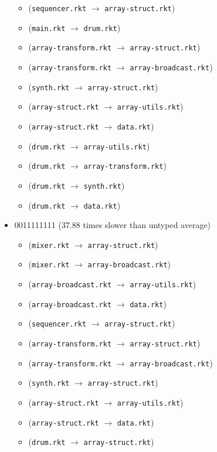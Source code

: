 \documentclass{article}
\newcommand{\mono}[1]{\texttt{#1}}
\begin{document}
\begin{itemize}
\begin{itemize}
  \item (\mono{sequencer.rkt} $\rightarrow$ \mono{array-struct.rkt})
  \item (\mono{main.rkt} $\rightarrow$ \mono{drum.rkt})
  \item (\mono{array-transform.rkt} $\rightarrow$ \mono{array-struct.rkt})
  \item (\mono{array-transform.rkt} $\rightarrow$ \mono{array-broadcast.rkt})
  \item (\mono{synth.rkt} $\rightarrow$ \mono{array-struct.rkt})
  \item (\mono{array-struct.rkt} $\rightarrow$ \mono{array-utils.rkt})
  \item (\mono{array-struct.rkt} $\rightarrow$ \mono{data.rkt})
  \item (\mono{drum.rkt} $\rightarrow$ \mono{array-utils.rkt})
  \item (\mono{drum.rkt} $\rightarrow$ \mono{array-transform.rkt})
  \item (\mono{drum.rkt} $\rightarrow$ \mono{synth.rkt})
  \item (\mono{drum.rkt} $\rightarrow$ \mono{data.rkt})
  \end{itemize}
\item 0011111111 (37.88 times slower than untyped average)
  \begin{itemize}
  \item (\mono{mixer.rkt} $\rightarrow$ \mono{array-struct.rkt})
  \item (\mono{mixer.rkt} $\rightarrow$ \mono{array-broadcast.rkt})
  \item (\mono{array-broadcast.rkt} $\rightarrow$ \mono{array-utils.rkt})
  \item (\mono{array-broadcast.rkt} $\rightarrow$ \mono{data.rkt})
  \item (\mono{sequencer.rkt} $\rightarrow$ \mono{array-struct.rkt})
  \item (\mono{array-transform.rkt} $\rightarrow$ \mono{array-struct.rkt})
  \item (\mono{array-transform.rkt} $\rightarrow$ \mono{array-broadcast.rkt})
  \item (\mono{synth.rkt} $\rightarrow$ \mono{array-struct.rkt})
  \item (\mono{array-struct.rkt} $\rightarrow$ \mono{array-utils.rkt})
  \item (\mono{array-struct.rkt} $\rightarrow$ \mono{data.rkt})
  \item (\mono{drum.rkt} $\rightarrow$ \mono{array-struct.rkt})
  \end{itemize}

\end{itemize}
\end{document}
